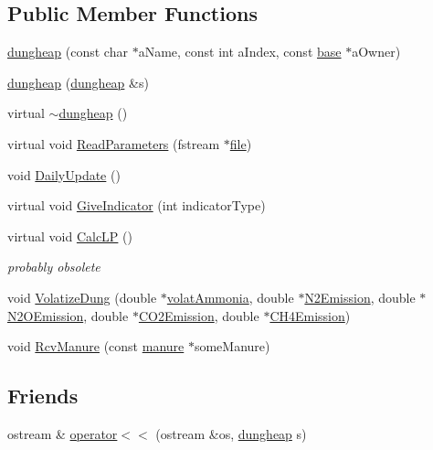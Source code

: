 \subsection*{Public Member Functions}
\begin{DoxyCompactItemize}
\item 
\hyperlink{classdungheap_afa14e95ebc5010c87c5436a1f8dee864}{dungheap} (const char $\ast$aName, const int aIndex, const \hyperlink{classbase}{base} $\ast$aOwner)
\item 
\hyperlink{classdungheap_ae85a443b5115bd4b0106dbd199812b7b}{dungheap} (\hyperlink{classdungheap}{dungheap} \&s)
\item 
virtual \hyperlink{classdungheap_ab819ea784b8f0af38dce38b8697498d8}{$\sim$dungheap} ()
\item 
virtual void \hyperlink{classdungheap_a369749ce14a7061f1c1f4e0c6973d68f}{ReadParameters} (fstream $\ast$\hyperlink{classbase_a3af52ee9891719d09b8b19b42450b6f6}{file})
\item 
void \hyperlink{classdungheap_ab901a0eba5e5cb9164042bbfad350435}{DailyUpdate} ()
\item 
virtual void \hyperlink{classdungheap_ac8c6b260da69dabe3a0019f9a5d8d499}{GiveIndicator} (int indicatorType)
\item 
virtual void \hyperlink{classdungheap_af4b63f00620c98cefc7008b5bc6b2170}{CalcLP} ()
\begin{DoxyCompactList}\small\item\em probably obsolete \item\end{DoxyCompactList}\item 
void \hyperlink{classdungheap_ac5ed38db9dc9fd3be29ebec8d5034402}{VolatizeDung} (double $\ast$\hyperlink{classmanurestore_ac9d398e432684fb02bfaf52c2f0e9ae8}{volatAmmonia}, double $\ast$\hyperlink{classmanurestore_a9a8d525f55145b43f2ab275fb9b5f35f}{N2Emission}, double $\ast$\hyperlink{classmanurestore_aca5ad359219f1f6c9a957f03156136ab}{N2OEmission}, double $\ast$\hyperlink{classmanurestore_aebc6ae97114292e973c57cbc2ecc4f84}{CO2Emission}, double $\ast$\hyperlink{classmanurestore_ae472072caaaea49932fe2152e6a4fb09}{CH4Emission})
\item 
void \hyperlink{classdungheap_a852054912c04f101c0a3310e80d6d53b}{RcvManure} (const \hyperlink{classmanure}{manure} $\ast$someManure)
\end{DoxyCompactItemize}
\subsection*{Friends}
\begin{DoxyCompactItemize}
\item 
ostream \& \hyperlink{classdungheap_a90fa119f05925fe4eaa6d738c3db6f65}{operator$<$$<$} (ostream \&os, \hyperlink{classdungheap}{dungheap} s)
\end{DoxyCompactItemize}



